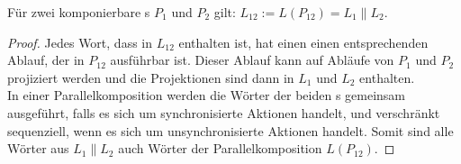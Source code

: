 \begin{Prop}
  \label{LParallelProp}
  Für zwei komponierbare \MEIO{}s $P_1$ und $P_2$ gilt: $L_{12} := L(P_{12}) =
  L_1\|L_2$.
\end{Prop}
\begin{proof}
  Jedes Wort, dass in $L_{12}$ enthalten ist, hat einen einen entsprechenden
  Ablauf, der in $P_{12}$ ausführbar ist. Dieser Ablauf kann auf Abläufe von
  $P_1$ und $P_2$ projiziert werden und die Projektionen sind dann in $L_1$ und
  $L_2$ enthalten.\\
  In einer Parallelkomposition werden die Wörter der beiden \MEIO{}s gemeinsam
  ausgeführt, falls es sich um synchronisierte Aktionen handelt, und
  verschränkt sequenziell, wenn es sich um unsynchronisierte Aktionen handelt.
  Somit sind alle Wörter aus $L_1\|L_2$ auch Wörter der Parallelkomposition
  $L(P_{12})$.
\end{proof}

